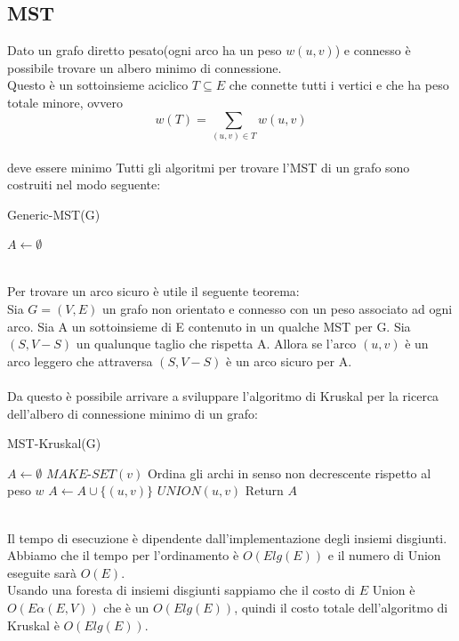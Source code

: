 \documentclass[]{article}
\begin{document}
\subsection{MST}
Dato un grafo diretto pesato(ogni arco ha un peso $w(u,v)$) e connesso è possibile trovare un albero minimo di connessione.\\
Questo è un sottoinsieme aciclico $T\subseteq E$ che connette tutti i vertici e che ha peso totale minore, ovvero\\
$$w(T) = \sum_{(u,v)\in T} w(u,v)$$ \\
deve essere minimo
\newpage
Tutti gli algoritmi per trovare l'MST di un grafo sono costruiti nel modo seguente:
\begin{algorithm}
\caption{Generic-MST(G)}
\begin{algorithmic}[1]
\STATE $A \leftarrow \emptyset$
\ENDWHILE
\end{algorithmic}
\end{algorithm}
\\
Per trovare un arco sicuro è utile il seguente teorema:\\
Sia $G=(V,E)$ un grafo non orientato e connesso con un peso associato ad ogni arco. Sia A un sottoinsieme di E contenuto in un qualche MST per G. Sia $(S, V-S)$ un qualunque taglio che rispetta A. Allora se l'arco $(u,v)$ è un arco leggero che attraversa $(S, V-S)$ è un arco sicuro per A.\\\\
Da questo è possibile arrivare a sviluppare l'algoritmo di Kruskal per la ricerca dell'albero di connessione minimo di un grafo:
\begin{algorithm}
\caption{MST-Kruskal(G)}
\begin{algorithmic}[1]
\STATE $A \leftarrow \emptyset$
	\STATE $MAKE\mbox{-}SET(v)$
\ENDFOR 
\STATE Ordina gli archi in senso non decrescente rispetto al peso $w$
		\STATE $A \leftarrow A \cup \{(u,v)\}$
		\STATE $UNION(u,v)$	
	\ENDIF
\ENDFOR
\STATE Return $A$
\end{algorithmic}
\end{algorithm}
\\
Il tempo di esecuzione è dipendente dall'implementazione degli insiemi disgiunti.\\
Abbiamo che il tempo per l'ordinamento è $O(Elg(E))$ e il numero di Union eseguite sarà $O(E)$.\\
Usando una foresta di insiemi disgiunti sappiamo che il costo di $E$ Union è $O(E\alpha(E,V))$ che è un $O(Elg(E))$, quindi il costo totale dell'algoritmo di Kruskal è $O(Elg(E))$.
\end{document}
